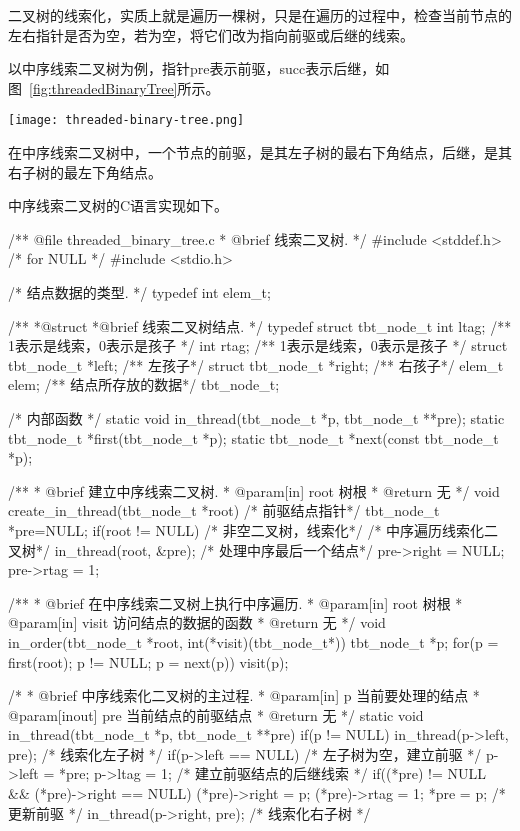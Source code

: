 二叉树的线索化，实质上就是遍历一棵树，只是在遍历的过程中，检查当前节点的左右指针是否为空，若为空，将它们改为指向前驱或后继的线索。

以中序线索二叉树为例，指针pre表示前驱，succ表示后继，如图~\ref{fig:threadedBinaryTree}所示。

\begin{center}
\texttt{[image: threaded-binary-tree.png]} \\
\label{fig:threadedBinaryTree}
\end{center}

在中序线索二叉树中，一个节点的前驱，是其左子树的最右下角结点，后继，是其右子树的最左下角结点。

中序线索二叉树的C语言实现如下。
\begin{Codex}[label=theaded_binary_tree.c]
/** @file threaded_binary_tree.c
  * @brief 线索二叉树.
  */
#include <stddef.h>    /* for NULL */
#include <stdio.h>

/* 结点数据的类型. */
typedef int elem_t;

 /**
  *@struct
  *@brief 线索二叉树结点.
  */
typedef struct tbt_node_t {
    int ltag; /** 1表示是线索，0表示是孩子 */
    int rtag; /** 1表示是线索，0表示是孩子 */
    struct tbt_node_t *left; /** 左孩子*/
    struct tbt_node_t *right; /** 右孩子*/
    elem_t elem; /** 结点所存放的数据*/
}tbt_node_t;

/* 内部函数 */
static void in_thread(tbt_node_t *p, tbt_node_t **pre);
static tbt_node_t *first(tbt_node_t *p);
static tbt_node_t *next(const tbt_node_t *p);

 /**
  * @brief 建立中序线索二叉树.
  * @param[in] root 树根
  * @return 无
  */
void create_in_thread(tbt_node_t *root) {
    /* 前驱结点指针*/
    tbt_node_t *pre=NULL;
    if(root != NULL) { /* 非空二叉树，线索化*/
        /* 中序遍历线索化二叉树*/
        in_thread(root, &pre);
        /* 处理中序最后一个结点*/
        pre->right = NULL;
        pre->rtag = 1;
    }
}


/**
  * @brief 在中序线索二叉树上执行中序遍历.
  * @param[in] root 树根
  * @param[in] visit 访问结点的数据的函数
  * @return 无
  */
void in_order(tbt_node_t *root, int(*visit)(tbt_node_t*)) {
    tbt_node_t *p;
    for(p = first(root); p != NULL; p = next(p)) {
        visit(p);
    }
}


 /*
  * @brief 中序线索化二叉树的主过程.
  * @param[in] p 当前要处理的结点
  * @param[inout] pre 当前结点的前驱结点
  * @return 无
  */
static void in_thread(tbt_node_t *p, tbt_node_t **pre) {
    if(p != NULL) {
        in_thread(p->left, pre); /* 线索化左子树 */
        if(p->left == NULL) {  /* 左子树为空，建立前驱 */
            p->left = *pre;
            p->ltag = 1;
        }
        /* 建立前驱结点的后继线索 */
        if((*pre) != NULL &&
            (*pre)->right == NULL) {
            (*pre)->right = p;
            (*pre)->rtag = 1;
        }
        *pre = p; /* 更新前驱 */
        in_thread(p->right, pre); /* 线索化右子树 */
    }
}


\end{Codex}

